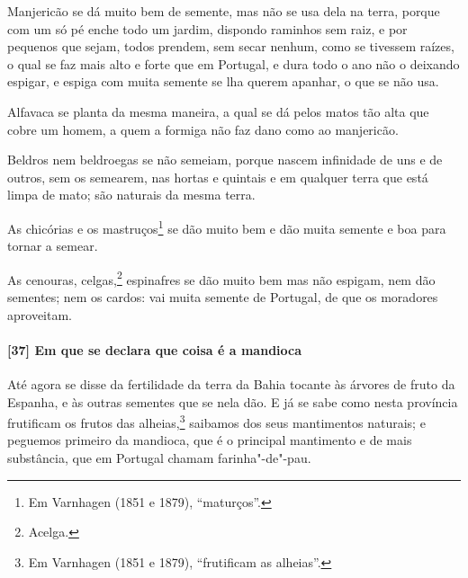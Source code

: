 Manjericão se dá muito bem de semente, mas não se usa dela na terra, porque com um só pé
enche todo um jardim, dispondo raminhos sem raiz, e por pequenos que sejam, todos prendem,
sem secar nenhum, como se tivessem raízes, o qual se faz mais alto e forte que em
Portugal, e dura todo o ano não o deixando espigar, e espiga com muita semente se lha
querem apanhar, o que se não usa.

Alfavaca se planta da mesma maneira, a qual se dá pelos matos tão alta que cobre um homem,
a quem a formiga não faz dano como ao manjericão.

Beldros nem beldroegas se não semeiam, porque nascem infinidade de uns e de outros, sem os
semearem, nas hortas e quintais e em qualquer terra que está limpa de mato; são naturais
da mesma terra.

As chicórias e os mastruços\footnote{ Em Varnhagen (1851 e 1879), ``maturços''.} se dão
muito bem e dão muita semente e boa para tornar a semear.

As cenouras, celgas,\footnote{ Acelga.} espinafres se dão muito bem mas não espigam, nem
dão sementes; nem os cardos: vai muita semente de Portugal, de que os moradores
aproveitam.

\paragraph{[37] Em que se declara que coisa é a mandioca}\quad
Até agora se disse da fertilidade da terra da Bahia tocante às árvores de fruto da
Espanha, e às outras sementes que se nela dão. E já se sabe como nesta província
frutificam os frutos das alheias,\footnote{ Em Varnhagen (1851 e 1879), ``frutificam as
alheias''.} saibamos dos seus mantimentos naturais; e peguemos primeiro da mandioca, que é
o principal mantimento e de mais substância, que em Portugal chamam farinha"-de"-pau.

